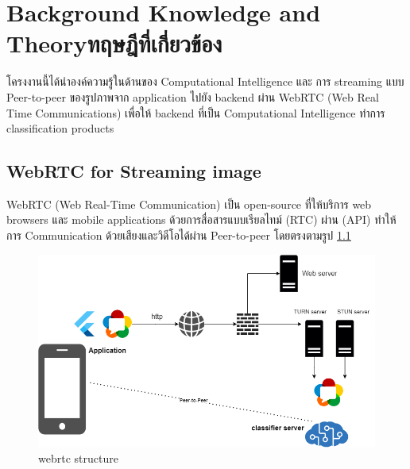 \chapter{\ifenglish Background Knowledge and Theory\else ทฤษฎีที่เกี่ยวข้อง\fi}

โครงงานนี้ได้นำองค์ความรู้ในด้านของ Computational Intelligence และ การ streaming แบบ Peer-to-peer   
ของรูปภาพจาก application ไปยัง backend ผ่าน WebRTC (Web Real Time Communications) เพื่อให้ backend 
ที่เป็น Computational Intelligence ทำการ classification products  
  
  
\section{WebRTC for Streaming image}
WebRTC (Web Real-Time Communication) เป็น open-source  ที่ให้บริการ  web browsers
 และ mobile applications ด้วยการสื่อสารแบบเรียลไทม์ (RTC) ผ่าน (API)  
 ทำให้การ Communication ด้วยเสียงและวิดีโอได้ผ่าน  Peer-to-peer   โดยตรงตามรูป \ref{fig:webrtc structure}
 
 
\begin{figure}[h]
\begin{center}
\includegraphics[scale=0.5]{pic/webrtc.png}
\end{center}

\caption[webrtc structure]{webrtc structure}
\label{fig:webrtc structure}
\end{figure}



